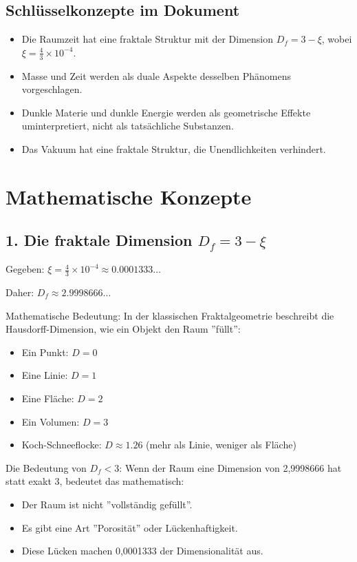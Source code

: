 \documentclass[12pt,a4paper]{article}
\begin{document}
	\subsection{Schlüsselkonzepte im Dokument}
	\begin{itemize}
		\item Die Raumzeit hat eine fraktale Struktur mit der Dimension \( D_f = 3 - \xi \), wobei \( \xi = \frac{4}{3} \times 10^{-4} \).
		\item Masse und Zeit werden als duale Aspekte desselben Phänomens vorgeschlagen.
		\item Dunkle Materie und dunkle Energie werden als geometrische Effekte uminterpretiert, nicht als tatsächliche Substanzen.
		\item Das Vakuum hat eine fraktale Struktur, die Unendlichkeiten verhindert.
	\end{itemize}
	
	\section{Mathematische Konzepte}
	
	\subsection{1. Die fraktale Dimension \( D_f = 3 - \xi \)}
	Gegeben: \( \xi = \frac{4}{3} \times 10^{-4} \approx 0.0001333\ldots \)
	
	Daher: \( D_f \approx 2.9998666\ldots \)
	
	Mathematische Bedeutung:
	In der klassischen Fraktalgeometrie beschreibt die Hausdorff-Dimension, wie ein Objekt den Raum ''füllt'':
	\begin{itemize}
		\item Ein Punkt: \( D = 0 \)
		\item Eine Linie: \( D = 1 \)
		\item Eine Fläche: \( D = 2 \)
		\item Ein Volumen: \( D = 3 \)
		\item Koch-Schneeflocke: \( D \approx 1.26 \) (mehr als Linie, weniger als Fläche)
	\end{itemize}
	
	Die Bedeutung von \( D_f < 3 \):
	Wenn der Raum eine Dimension von 2,9998666 hat statt exakt 3, bedeutet das mathematisch:
	\begin{itemize}
		\item Der Raum ist nicht ''vollständig gefüllt''.
		\item Es gibt eine Art ''Porosität'' oder Lückenhaftigkeit.
		\item Diese Lücken machen 0,0001333 der Dimensionalität aus.
	\end{itemize}
	
\end{document}
